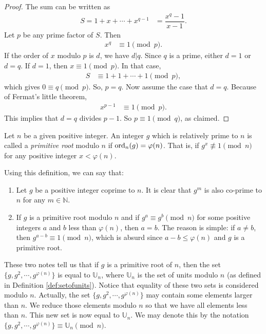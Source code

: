 \documentclass{subfile}
\begin{document}
	\begin{proof}
		The sum can be written as
			\begin{align*}
				S = 1+x+\cdots+x^{q-1} & = \dfrac{x^q-1}{x-1}.
			\end{align*}
		Let $p$ be any prime factor of $S$. Then
			\begin{align*}
				x^q & \equiv1\pmod p.
			\end{align*}
		If the order of $x$ modulo $p$ is $d$, we have $d|q$. Since $q$ is a prime, either $d=1$ or $d=q$. If $d=1$, then $x\equiv1\pmod p$. In that case,
			\begin{align*}
				S & \equiv 1+1+\cdots+1\pmod p,
			\end{align*}
		which gives $0  \equiv q\pmod p$. So, $p=q$. Now assume the case that $d=q$. Because of Fermat's little theorem,
			\begin{align*}
				x^{p-1} & \equiv1\pmod p.
			\end{align*}
		This implies that $d=q$ divides $p-1$. So $p\equiv1\pmod q$, as claimed.
	\end{proof}
	
	\begin{definition}
		Let $n$ be a given positive integer. An integer $g$ which is relatively prime to $n$  is called a \textit{primitive root} modulo $n$ if $\operatorname{ord}_n(g)=\varphi(n)$. That is, if $g^x\not\equiv1\pmod n$ for any positive integer $x<\varphi(n)$. 
	\end{definition}

	\begin{note}
		Using this definition, we can say that:
			\begin{enumerate}
				\item Let $g$ be a positive integer coprime to $n$. It is clear that $g^m$ is also co-prime to $n$ for any $m \in \mathbb N$. 
				\item If $g$ is a primitive root modulo $n$ and if $g^a \equiv g^b \pmod n$ for some positive integers $a$ and $b$ less than $\varphi(n)$, then $a=b$. The reason is simple: if $a \neq b$, then $g^{a-b} \equiv 1 \pmod n$, which is absurd since $a-b \leq \varphi(n)$ and $g$ is a primitive root.
			\end{enumerate}
	\end{note}
		
These two notes tell us that if $g$ is a primitive root of $n$, then the set $\{g,g^2,\cdots,g^{\varphi(n)}\}$ is equal to $\mathbb U_n$, where $\mathbb U_n$ is the set of units modulo $n$ (as defined in Definition \ref{def:setofunits}). Notice that equality of these two sets is considered modulo $n$. Actually, the set $\{g,g^2,\cdots,g^{\varphi(n)}\}$ may contain some elements larger than $n$. We reduce those elements modulo $n$ so that we have all elements less than $n$. This new set is now equal to $\mathbb U_n$. We may denote this by the notation $\{g,g^2,\cdots,g^{\varphi(n)}\} \equiv \mathbb U_n \pmod n$.
\end{document}
